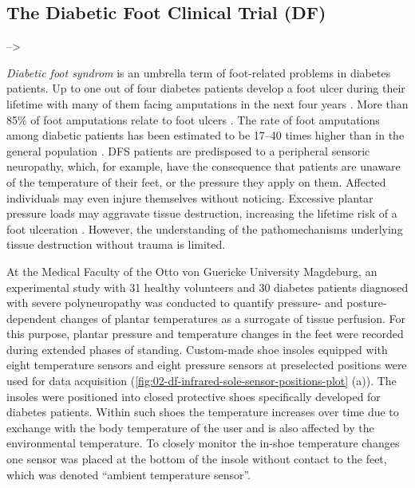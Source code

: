 \documentclass[
  oneside]{book}
\begin{document}
\hypertarget{the-diabetic-foot-clinical-trial-df}{%
\subsection{The Diabetic Foot Clinical Trial (DF)}\label{the-diabetic-foot-clinical-trial-df}}

--\textgreater{}

\emph{Diabetic foot syndrom} is an umbrella term of foot-related problems in diabetes patients.
Up to one out of four diabetes patients develop a foot ulcer during their lifetime \autocite{RN1} with many of them facing amputations in the next four years \autocite{RN2}.
More than 85\% of foot amputations relate to foot ulcers \autocite{RN3,RN4}.
The rate of foot amputations among diabetic patients has been estimated to be 17--40 times higher than in the general population \autocite{fard2007assessment}.
DFS patients are predisposed to a peripheral sensoric neuropathy, which, for example, have the consequence that patients are unaware of the temperature of their feet, or the pressure they apply on them.
Affected individuals may even injure themselves without noticing.
Excessive plantar pressure loads may aggravate tissue destruction, increasing the lifetime risk of a foot ulceration \autocite{SinghEtAl:PreventingFootUlcers2005}.
However, the understanding of the pathomechanisms underlying tissue destruction without trauma is limited.

At the Medical Faculty of the Otto von Guericke University Magdeburg, an experimental study with 31 healthy volunteers and 30 diabetes patients diagnosed with severe polyneuropathy was conducted to quantify pressure- and posture-dependent changes of plantar temperatures as a surrogate of tissue perfusion.
For this purpose, plantar pressure and temperature changes in the feet were recorded during extended phases of standing.
Custom-made shoe insoles
equipped with eight temperature sensors and eight pressure sensors at preselected positions were used for data acquisition (\ref{fig:02-df-infrared-sole-sensor-positions-plot} (a)).
The insoles were positioned into closed protective shoes specifically developed for diabetes patients.
Within such shoes the temperature increases over time due to exchange with the body temperature of the user and is also affected by the environmental temperature.
To closely monitor the in-shoe temperature changes one sensor was placed at the bottom of the insole without contact to the feet, which was denoted ``ambient temperature sensor''.
\end{document}
